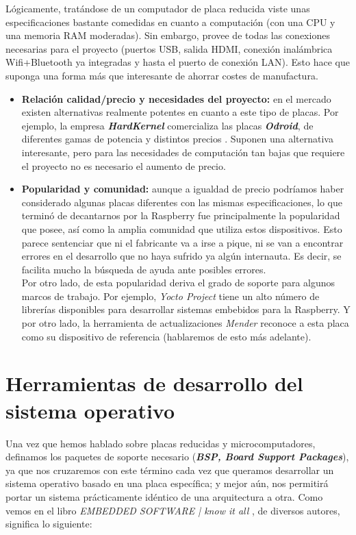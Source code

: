 Lógicamente, tratándose de un computador de placa reducida viste unas especificaciones bastante comedidas en cuanto a computación (con una CPU y una memoria RAM moderadas). Sin embargo, provee de todas las conexiones necesarias para el proyecto (puertos USB, salida HDMI, conexión inalámbrica Wifi+Bluetooth ya integradas y hasta el puerto de conexión LAN). Esto hace que suponga una forma más que interesante de ahorrar costes de manufactura.

\begin{itemize}
	\item \textbf{Relación calidad/precio y necesidades del proyecto:} en el mercado existen alternativas realmente potentes en cuanto a este tipo de placas. Por ejemplo, la empresa \textbf{\textit{HardKernel}} comercializa las placas \textit{\textbf{Odroid}}, de diferentes gamas de potencia y distintos precios \cite{odroid-products}. Suponen una alternativa interesante, pero para las necesidades de computación tan bajas que requiere el proyecto no es necesario el aumento de precio.
	\item \textbf{Popularidad y comunidad:} aunque a igualdad de precio podríamos haber considerado algunas placas diferentes con las mismas especificaciones, lo que terminó de decantarnos por la Raspberry fue principalmente la popularidad que posee, así como la amplia comunidad que utiliza estos dispositivos. Esto parece sentenciar que ni el fabricante va a irse a pique, ni se van a encontrar errores en el desarrollo que no haya sufrido ya algún internauta. Es decir, se facilita mucho la búsqueda de ayuda ante posibles errores.\\
	
	Por otro lado, de esta popularidad deriva el grado de soporte para algunos marcos de trabajo. Por ejemplo, \textit{Yocto Project} tiene un alto número de librerías disponibles para desarrollar sistemas embebidos para la Raspberry. Y por otro lado, la herramienta de actualizaciones \textit{Mender} reconoce a esta placa como su dispositivo de referencia \cite{mender-raspberry-pi} (hablaremos de esto más adelante).
\end{itemize}

\section{Herramientas de desarrollo del sistema operativo}

Una vez que hemos hablado sobre placas reducidas y microcomputadores, definamos los paquetes de soporte necesario (\textbf{\textit{BSP, Board Support Packages}}), ya que nos cruzaremos con este término cada vez que queramos desarrollar un sistema operativo basado en una placa específica; y mejor aún, nos permitirá portar un sistema prácticamente idéntico de una arquitectura a otra. Como vemos en el libro \textit{EMBEDDED SOFTWARE | know it all} \cite{embedded-software-know-it-all}, de diversos autores, significa lo siguiente:

